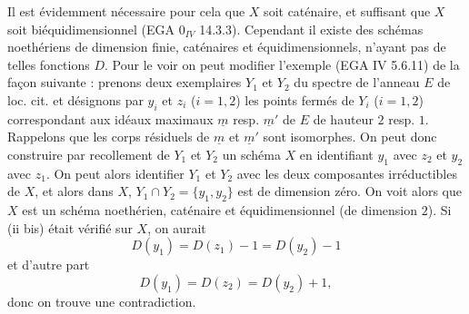 

Il est
évidemment nécessaire pour cela que $X$ soit caténaire, et suffisant que $X$ soit biéquidimensionnel (EGA $0_{IV}$ 14.3.3). Cependant il existe des schémas noethériens de dimension finie, caténaires et équidimensionnels, n'ayant pas de telles fonctions $D$. Pour le voir on peut modifier l'exemple (EGA IV 5.6.11) de la façon suivante : prenons deux exemplaires $Y_1$ et $Y_2$ du spectre de l'anneau $E$ de loc. cit. et désignons par $y_i$ et $z_i$ ($i=1,2$) les points fermés de $Y_i$ ($i=1,2$) correspondant aux idéaux maximaux $\underline{m}$ resp. $\underline{m}'$ de $E$ de hauteur $2$ resp. $1$. Rappelons que les corps résiduels de $\underline{m}$ et $\underline{m}'$ sont isomorphes. On peut donc construire par recollement de $Y_1$ et $Y_2$ un schéma $X$ en identifiant $y_1$ avec $z_2$ et $y_2$ avec $z_1$. On peut alors identifier $Y_1$ et $Y_2$ avec les deux composantes irréductibles de $X$, et alors dans $X$, $Y_1\cap Y_2=\{y_1,y_2\}$ est de dimension zéro. On voit alors que $X$ est un schéma noethérien, caténaire et équidimensionnel (de dimension $2$). Si (ii bis) était vérifié sur $X$, on aurait
\[
D(y_1)=D(z_1)-1=D(y_2)-1
\]
et d'autre part
\[
D(y_1)=D(z_2)=D(y_2)+1,
\]
donc on trouve une contradiction.

